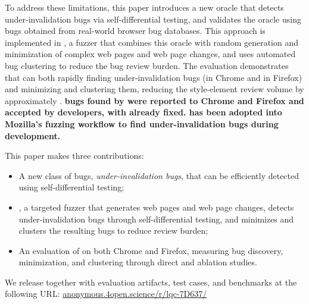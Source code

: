 To address these limitations, this paper introduces
  a new oracle that detects under-invalidation bugs
  via self-differential testing,
  and validates the oracle using bugs obtained from
  real-world browser bug databases.
This approach is implemented in \toolname, a fuzzer
  that combines this oracle with random generation
  and minimization of complex web pages and web page changes,
  and uses automated bug clustering
  to reduce the bug review burden.
The evaluation demonstrates that \toolname can
  both rapidly finding under-invalidation bugs
  (\NumBugsChromeWeights in Chrome and \NumBugsFfxWeights in Firefox)
  and minimizing and clustering them,
  reducing the style-element review volume by approximately
  \StyleElementOriginalToClusteredFactor{}.
\textbf{
\NumBugsNovel bugs found by \toolname
  were reported to Chrome and Firefox
  and accepted by developers, with \NumBugsFixed already fixed.
\toolname has been adopted into Mozilla's fuzzing workflow
  to find under-invalidation bugs during development.
}

\medskip
\noindent
This paper makes three contributions:
\begin{itemize}
    \item A new class of bugs, \emph{under-invalidation bugs},
      that can be efficiently detected using self-differential testing;
    \item \toolname, a targeted fuzzer
      that generates web pages and web page changes,
      detects under-invalidation bugs through self-differential testing,
      and minimizes and clusters the resulting bugs to reduce review burden;
    \item An evaluation of \toolname on both Chrome and Firefox,
      measuring bug discovery, minimization, and clustering
      through direct and ablation studies.
\end{itemize}
\noindent
We release \toolname
  together with evaluation artifacts, test cases, and benchmarks
  at the following URL:
  \href{https://anonymous.4open.science/r/lqc-7D637/}
       {anonymous.4open.science/r/lqc-7D637/}
